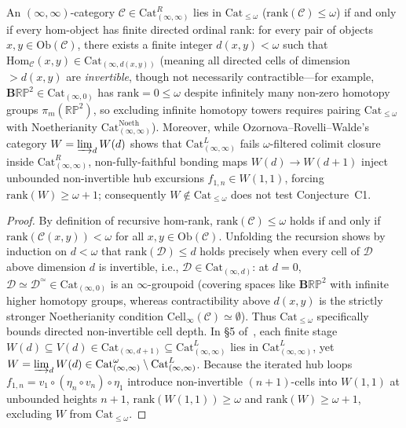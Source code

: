 \begin{proposition}\label{prop:cat-le-omega-lfd}
An $(\infty, \infty)$-category $\mathcal{C} \in \mathrm{Cat}^R_{(\infty, \infty)}$ lies in $\mathrm{Cat}_{\le \omega}$ ($\mathrm{rank}(\mathcal{C}) \le \omega$) if and only if every hom-object has finite directed ordinal rank: for every pair of objects $x, y \in \mathrm{Ob}(\mathcal{C})$, there exists a finite integer $d(x, y) < \omega$ such that $\mathrm{Hom}_{\mathcal{C}}(x, y) \in \mathrm{Cat}_{(\infty, d(x, y))}$ (meaning all directed cells of dimension $> d(x, y)$ are \emph{invertible}, though not necessarily contractible---for example, $\mathbf{B}\mathbb{R}\mathbb{P}^2 \in \mathrm{Cat}_{(\infty, 0)}$ has $\mathrm{rank} = 0 \le \omega$ despite infinitely many non-zero homotopy groups $\pi_m(\mathbb{R}\mathbb{P}^2)$, so excluding infinite homotopy towers requires pairing $\mathrm{Cat}_{\le \omega}$ with Noetherianity $\mathrm{Cat}^{\mathrm{Noeth}}_{(\infty,\infty)}$). Moreover, while Ozornova--Rovelli--Walde's~\cite[\S 5]{ORW26} category $W = \varinjlim_d W(d)$ shows that $\mathrm{Cat}^L_{(\infty, \infty)}$ fails $\omega$-filtered colimit closure inside $\mathrm{Cat}^R_{(\infty, \infty)}$, non-fully-faithful bonding maps $W(d) \to W(d+1)$ inject unbounded non-invertible hub excursions $f_{1, n} \in W(1, 1)$, forcing $\mathrm{rank}(W) \ge \omega + 1$; consequently $W \notin \mathrm{Cat}_{\le \omega}$ does not test Conjecture~C1.
\end{proposition}

\begin{proof}
By definition of recursive hom-rank, $\mathrm{rank}(\mathcal{C}) \le \omega$ holds if and only if $\mathrm{rank}(\mathcal{C}(x, y)) < \omega$ for all $x, y \in \mathrm{Ob}(\mathcal{C})$. Unfolding the recursion shows by induction on $d < \omega$ that $\mathrm{rank}(\mathcal{D}) \le d$ holds precisely when every cell of $\mathcal{D}$ above dimension $d$ is invertible, i.e., $\mathcal{D} \in \mathrm{Cat}_{(\infty, d)}$: at $d = 0$, $\mathcal{D} \simeq \mathcal{D}^{\simeq} \in \mathrm{Cat}_{(\infty, 0)}$ is an $\infty$-groupoid (covering spaces like $\mathbf{B}\mathbb{R}\mathbb{P}^2$ with infinite higher homotopy groups, whereas contractibility above $d(x, y)$ is the strictly stronger Noetherianity condition $\mathrm{Cell}_\infty(\mathcal{C}) \simeq \emptyset$). Thus $\mathrm{Cat}_{\le \omega}$ specifically bounds directed non-invertible cell depth. In \S 5 of~\cite{ORW26}, each finite stage $W(d) \subseteq V(d) \in \mathrm{Cat}_{(\infty, d+1)} \subseteq \mathrm{Cat}^L_{(\infty, \infty)}$ lies in $\mathrm{Cat}^L_{(\infty, \infty)}$, yet $W = \varinjlim_d W(d) \in \mathrm{Cat}^\omega_{(\infty, \infty)} \setminus \mathrm{Cat}^L_{(\infty, \infty)}$. Because the iterated hub loops $f_{1, n} = v_1 \circ (\eta_n \circ v_n) \circ \eta_1$ introduce non-invertible $(n+1)$-cells into $W(1, 1)$ at unbounded heights $n + 1$, $\mathrm{rank}(W(1, 1)) \ge \omega$ and $\mathrm{rank}(W) \ge \omega + 1$, excluding $W$ from $\mathrm{Cat}_{\le \omega}$.
\end{proof}

